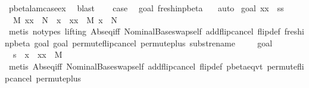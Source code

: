 \begin{isabellebody}
\ pbeta{\isacharunderscore}lam{\isacharunderscore}case{\isacharunderscore}ex\ \isamarkupfalse%
\ blast\isanewline
\ \ \isamarkupfalse%
\ {\isacharquery}case\ \isamarkupfalse%
\ goal{}\ fresh{\isacharunderscore}in{\isacharunderscore}pbeta\ \ \isamarkupfalse%
\ auto\isanewline
{}\isamarkupfalse%
\isanewline
{}\isamarkupfalse%
\ {\isacharparenleft}goal{}\ xx\ {\isacharunderscore}\ ss{\isacharparenright}\isanewline
\ \ \isamarkupfalse%
\ {}{\isacharcolon}\ {\isachardoublequoteopen}M{\isacharprime}\ {\isacharbrackleft}xx\ {\isacharcolon}{\isacharcolon}{\isacharequal}\ N{\isacharprime}{\isacharbrackright}\ {\isacharequal}\ {\isacharparenleft}{\isacharparenleft}x\ {\isasymleftrightarrow}\ xx{\isacharparenright}\ {\isasymbullet}\ M{\isacharprime}{\isacharparenright}\ {\isacharbrackleft}x\ {\isacharcolon}{\isacharcolon}{\isacharequal}\ N{\isacharprime}{\isacharbrackright}{\isachardoublequoteclose}\isanewline
\ \ \ \ \isamarkupfalse%
\ {\isacharparenleft}metis\ {\isacharparenleft}no{\isacharunderscore}types{\isacharcomma}\ lifting{\isacharparenright}\ Abs{}{\isacharunderscore}eq{\isacharunderscore}iff{\isacharparenleft}{}{\isacharparenright}\ Nominal{}{\isacharunderscore}Base{\isachardot}swap{\isacharunderscore}self\ add{\isacharunderscore}flip{\isacharunderscore}cancel\ flip{\isacharunderscore}def\ fresh{\isacharunderscore}in{\isacharunderscore}pbeta\ goal{}{\isacharparenleft}{}{\isacharparenright}\ goal{}{\isacharparenleft}{}{\isacharparenright}\ permute{\isacharunderscore}flip{\isacharunderscore}cancel\ permute{\isacharunderscore}plus\ subst{\isacharunderscore}rename{\isacharparenright}\ \isanewline
\ \ \isamarkupfalse%
\ goal{}\ \isamarkupfalse%
\ {}{\isacharcolon}\ {\isachardoublequoteopen}s\ {\isasymggreater}\ {\isacharparenleft}{\isacharparenleft}x\ {\isasymleftrightarrow}\ xx{\isacharparenright}\ {\isasymbullet}\ M{\isacharprime}{\isacharparenright}{\isachardoublequoteclose}\isanewline
\ \ \ \ \isamarkupfalse%
\ {\isacharparenleft}metis\ Abs{}{\isacharunderscore}eq{\isacharunderscore}iff{\isacharparenleft}{}{\isacharparenright}\ Nominal{}{\isacharunderscore}Base{\isachardot}swap{\isacharunderscore}self\ add{\isacharunderscore}flip{\isacharunderscore}cancel\ flip{\isacharunderscore}def\ pbeta{\isachardot}eqvt\ permute{\isacharunderscore}flip{\isacharunderscore}cancel\ permute{\isacharunderscore}plus{\isacharparenright}\isanewline

\end{isabellebody}
